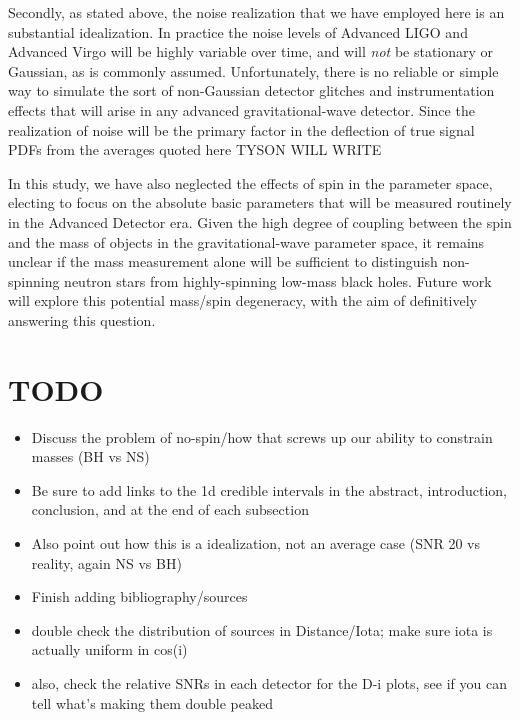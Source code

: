 \documentclass[11pt,a4paper]{emulateapj}
\newcommand{\carl}[1]{{\color{red}  #1}}
\begin{document}
Secondly, as stated above, the noise realization that we have employed here is an substantial idealization.  In practice the noise levels of Advanced LIGO and Advanced Virgo will be highly variable over time, and will \emph{not} be stationary or Gaussian, as is commonly assumed.  Unfortunately, there is no reliable or simple way to simulate the sort of non-Gaussian detector glitches and instrumentation effects that will arise in any advanced gravitational-wave detector.  Since the realization of noise will be the primary factor in the deflection of true signal PDFs from the averages quoted here \carl{TYSON WILL WRITE}

In this study, we have also neglected the effects of spin in the parameter space, electing to focus on the absolute basic
 parameters that will be measured routinely in the Advanced Detector era.  Given the high degree of coupling
between the spin and the mass of objects in the gravitational-wave parameter space, it remains unclear
if the mass measurement alone will be sufficient to distinguish non-spinning neutron stars from highly-spinning low-mass
black holes.  Future work will explore this potential mass/spin degeneracy, with the aim of definitively answering this question.  

\carl{
\section{TODO}
 \begin{itemize}
 \item Discuss the problem of no-spin/how that screws up our ability to constrain masses (BH vs NS)
 \item Be sure to add links to the 1d credible intervals in the abstract, introduction, conclusion, and at the end of each subsection
 \item Also point out how this is a idealization, not an average case (SNR 20 vs reality, again NS vs BH)
 \item Finish adding bibliography/sources
 \item double check the distribution of sources in Distance/Iota; make sure iota is actually uniform in cos(i)
 \item also, check the relative SNRs in each detector for the D-i plots, see if you can tell what's making them double peaked 
 \end{itemize}
 }


{}
\end{document}
